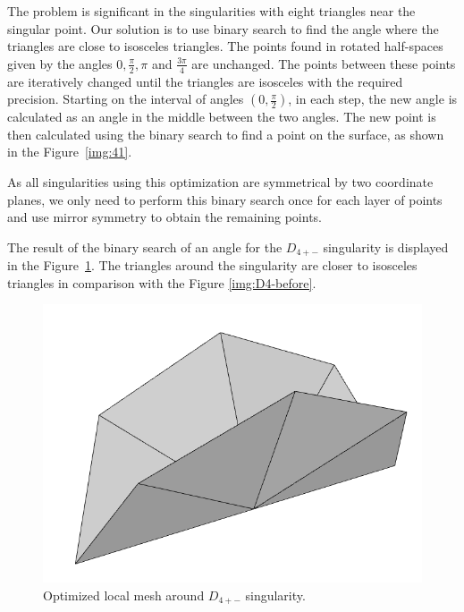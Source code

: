 The problem is significant in the singularities with eight triangles near
the singular point.
Our solution is to use binary search to find the angle where the triangles are
close to isosceles triangles. The points found in rotated half-spaces given by 
the angles $0, \frac{\pi}{2}, \pi$ and $\frac{3\pi}{4}$ are unchanged.
The points between these points are iteratively changed until the
triangles are isosceles with the required precision. Starting on the interval 
of angles $(0, \frac{\pi}{2})$, in each step, 
the new angle is calculated as an angle in the middle 
between the two angles. The new point is then calculated using the binary 
search to find a point on the surface, as shown in the Figure~\ref{img:41}.

As all singularities using this optimization are symmetrical by two coordinate
planes, we only need to perform this binary search once for each layer of 
points and use mirror symmetry to obtain the remaining points.

The result of the binary 
search of an angle for the $D_{4+-}$ singularity is displayed 
in the Figure~\ref{img:D4-after}. The triangles around the singularity
are closer to isosceles triangles in comparison with the Figure 
\ref{img:D4-before}.

\begin{figure}
    \centerline{\includegraphics[scale=0.25]{images/D4-after}}
    \caption[Optimized local mesh around $D_{4+-}$ singularity]
    {Optimized local mesh around $D_{4+-}$ singularity.}
    \label{img:D4-after}
\end{figure}


